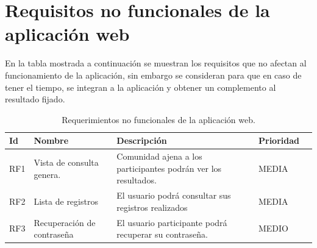 \section{Requisitos no funcionales de la aplicación web}
En la tabla mostrada a continuación se muestran los requisitos que no afectan al funcionamiento de la aplicación, sin embargo se consideran para que en caso de tener el tiempo, se integran a la aplicación y obtener un complemento al resultado fijado.
\begin{table}[htbp]
	\begin{center}
		\begin{tabular}{|l|p{45mm}|p{45mm}|p{45mm}|l}
			\hline
			Id & Nombre & Descripción & Prioridad \\
			\hline 
			RF1 & Vista de consulta genera. & Comunidad ajena a los participantes podrán ver los resultados. & MEDIA \\ \hline
			RF2 & Lista de registros &El usuario podrá consultar sus registros realizados & MEDIA   \\ \hline
			RF3 & Recuperación de contraseña &El usuario participante podrá recuperar su contraseña. & MEDIO \\ \hline
		\end{tabular}
		\caption{Requerimientos no funcionales de la aplicación web.}
		\label{tabla:sencilla}
	\end{center}
\end{table}


